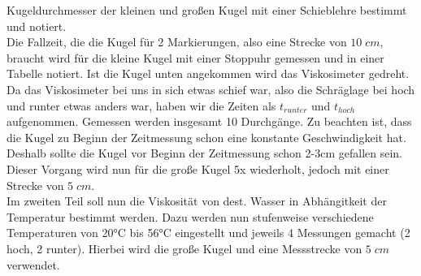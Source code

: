 Kugeldurchmesser der kleinen und großen Kugel mit einer Schieblehre bestimmt und notiert. 
\\
Die Fallzeit, die die Kugel für 2 Markierungen, also eine Strecke von $10\;\unit{cm}$, braucht wird für die kleine Kugel mit einer Stoppuhr
gemessen und in einer Tabelle notiert. Ist die Kugel unten angekommen wird das Viskosimeter gedreht.
Da das Viskosimeter bei uns in sich etwas schief war, also die Schräglage bei hoch und runter etwas anders war, haben wir die Zeiten als $t_{runter}$ und $t_{hoch}$ aufgenommen.
Gemessen werden insgesamt 10 Durchgänge.
Zu beachten ist, dass die Kugel zu Beginn der Zeitmessung schon eine konstante Geschwindigkeit hat. Deshalb sollte die Kugel vor Beginn der Zeitmessung schon 2-3cm gefallen sein.
\\
Dieser Vorgang wird nun für die große Kugel 5x wiederholt, jedoch mit einer Strecke von $5\;\unit{cm}$.
\\
Im zweiten Teil soll nun die Viskosität von dest. Wasser in Abhängitkeit der Temperatur bestimmt werden. Dazu werden nun stufenweise verschiedene Temperaturen 
von 20°C bis 56°C eingestellt und jeweils 4 Messungen gemacht (2 hoch, 2 runter). Hierbei wird die große Kugel und eine Messstrecke von $5\;\unit{cm}$ verwendet.
\newpage